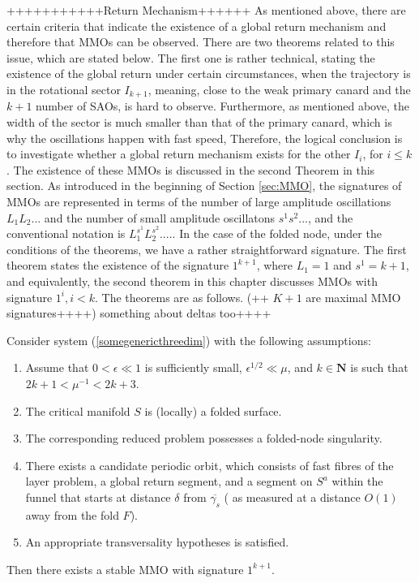 +++++++++++Return Mechanism++++++
As mentioned above, there are certain criteria that indicate the existence of a global return mechanism and therefore that MMOs can be observed.
There are two theorems related to this issue, which are stated below.
The first one is rather technical, stating the existence of the global return under certain circumstances, when the trajectory is in the rotational sector $I_{k+1}$, meaning, close to the weak primary canard and the $k+1$ number of SAOs, is hard to observe. Furthermore, as mentioned above, the width of the sector is much smaller than that of the primary canard, which is why the oscillations happen with fast speed, Therefore, the logical conclusion is to investigate whether a global return mechanism exists for the other $I_i$, for $i \leq k$. The existence of these MMOs is discussed in the second Theorem in this section.
As introduced in the beginning of Section \ref{sec:MMO},  the signatures of MMOs are represented in terms of the number of large amplitude oscillations $L_1L_2...$ and the number of small amplitude oscillatons $s^1s^2...$, and the conventional notation is $L_1^{s^1}L_2^{s^2}....$.
In the case of the folded node, under the conditions of the theorems, we have a rather straightforward signature. The first theorem states the existence of the signature $1^{k+1}$, where $L_1=1$ and $s^1=k+1$, and equivalently, the second theorem in this chapter discusses MMOs with signature $1^{i}, i<k$.
The theorems are as follows.
(++ $K+1$ are maximal MMO signatures++++) something about deltas too++++
\begin{theorem} \label{MMOsigk1}
Consider system (\ref{somegenericthreedim}) with the following assumptions:
\begin{enumerate}
\item Assume that $ 0 < \epsilon \ll 1$ is sufficiently small, $\epsilon^{1/2} \ll \mu$, and $k \in \mathbf{N}$ is such that $2k + 1 < \mu^{-1} < 2k + 3$.
\item The critical manifold $S$ is (locally) a folded surface.
\item The corresponding reduced problem possesses a folded-node singularity.
\item There exists a candidate periodic orbit, which consists of fast fibres of the layer problem, a global return segment, and a segment on $S^a$ within the funnel that starts at distance $\delta$ from $\overline{\gamma_s}$ ( as measured at a distance $O(1)$ away from the fold $F$).
\item An appropriate transversality hypotheses is satisfied.
\end{enumerate}
Then there exists a stable MMO with signature $1^{k+1}$.
\end{theorem}

